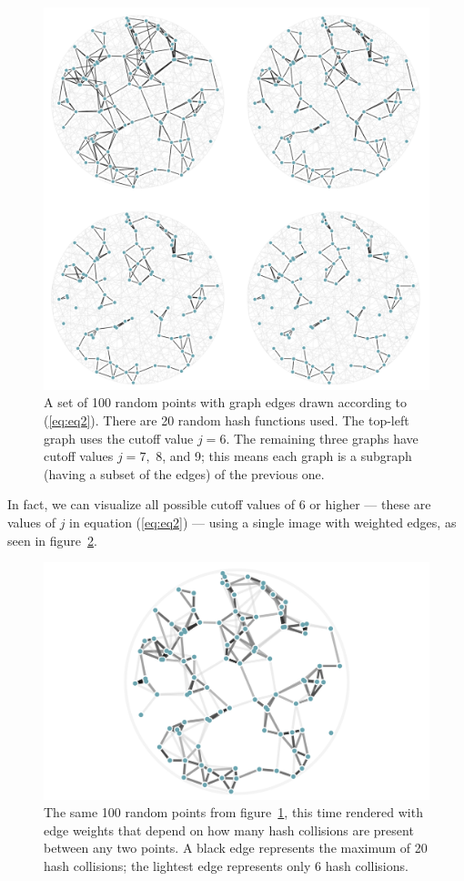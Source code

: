 \documentclass[20pt,]{extarticle}
\begin{document}
\begin{figure}
\centering
\includegraphics{images/lsh_image5.png}
\caption{A set of 100 random points with graph edges drawn according to
(\ref{eq:eq2}). There are 20 random hash functions used. The top-left
graph uses the cutoff value \(j=6.\) The remaining three graphs have
cutoff values \(j=7,\) 8, and 9; this means each graph is a subgraph
(having a subset of the edges) of the previous one.}\label{fig:fig5}
\end{figure}

In fact, we can visualize all possible cutoff values of 6 or higher ---
these are values of \(j\) in equation (\ref{eq:eq2}) --- using a single
image with weighted edges, as seen in figure~\ref{fig:fig6}.

\begin{figure}
\centering
\includegraphics{images/lsh_image6.png}
\caption{The same 100 random points from figure~\ref{fig:fig5}, this
time rendered with edge weights that depend on how many hash collisions
are present between any two points. A black edge represents the maximum
of 20 hash collisions; the lightest edge represents only 6 hash
collisions.}\label{fig:fig6}
\end{figure}
\end{document}
